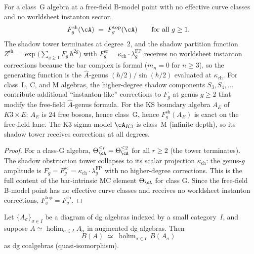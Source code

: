 \begin{proposition}[Class G free-field point: shadow \texorpdfstring{$=$}{=} topological string]
\label{prop:class-g-no-instantons}
For a class~G algebra at a free-field B-model point with no effective
curve classes and no worldsheet instanton sector,
\begin{equation}\label{eq:class-g-exact}
F_g^{\mathrm{sh}}(\cA) \;=\; F_g^{\mathrm{top}}(\cA)
\qquad \text{for all } g \geq 1.
\end{equation}
The shadow tower terminates at degree~$2$, and the shadow partition function
$Z^{\mathrm{sh}} = \exp\!\bigl(\sum_{g \geq 1}
F_g\,\hbar^{2g}\bigr)$ with
$F_g^{\mathrm{sc}} = \kappa_{\mathrm{ch}} \cdot \lambda_g^{\mathrm{FP}}$ receives no
worldsheet instanton corrections because the bar complex is
formal \textup{(}$m_n = 0$ for $n \geq 3$\textup{)},
so the generating function is the $\hat{A}$-genus
$(\hbar/2)/\sin(\hbar/2)$ evaluated at $\kappa_{\mathrm{ch}}$. For
class~L, C, and M algebras, the higher-degree shadow
components $S_3, S_4, \ldots$ contribute additional
``instanton-like'' corrections to $F_g$ at genus $g \geq 2$
that modify the free-field $\hat{A}$-genus formula.
For the KS boundary algebra $A_E$ of $K3 \times E$:
$A_E$ is $24$ free bosons, hence class~G, hence
$F_g^{\mathrm{sh}}(A_E)$ is exact on the free-field lane. The K3 sigma model
$\cA_{K3}$ is class~M \textup{(}infinite depth\textup{)},
so its shadow tower receives corrections at all degrees.
\end{proposition}

\begin{proof}
For a class-G algebra, $\Theta_\cA^{\leq r} = \Theta_\cA^{\leq 2}$
for all $r \geq 2$ (the tower terminates). The shadow obstruction
tower collapses to its scalar projection $\kappa_{\mathrm{ch}}$: the genus-$g$
amplitude is $F_g=F_g^{\mathrm{sc}}=\kappa_{\mathrm{ch}} \cdot \lambda_g^{\mathrm{FP}}$ with no higher-degree corrections. This is the full content of the
bar-intrinsic MC element $\Theta_\cA$ for class G. Since the
free-field B-model point has no effective curve classes and receives no
worldsheet instanton corrections,
$F_g^{\mathrm{top}} = F_g^{\mathrm{sh}}$.
\end{proof}


\begin{proposition}
\label{prop:bar-hocolim}
Let $\{A_\sigma\}_{\sigma \in I}$ be a diagram of dg algebras
indexed by a small category~$I$, and suppose
$A\simeq\operatorname{holim}_{\sigma\in I}A_\sigma$ in augmented dg
algebras. Then
\begin{equation}\label{eq:bar-hocolim-k3xe}
B(A)
\;\simeq\;
\operatorname{holim}_{\sigma \in I}\, B(A_\sigma)
\end{equation}
as dg coalgebras \textup{(}quasi-isomorphism\textup{)}.
\end{proposition}

